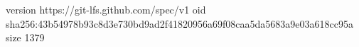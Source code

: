 version https://git-lfs.github.com/spec/v1
oid sha256:43b54978b93c8d3e730bd9ad2f41820956a69f08caa5da5683a9e03a618cc95a
size 1379
